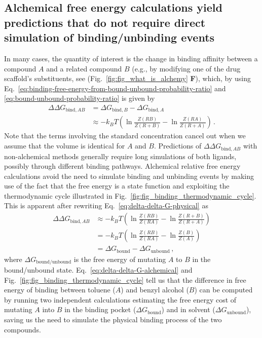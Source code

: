 \documentclass[9pt,bestpractices]{livecoms}
\begin{document}
\subsection{Alchemical free energy calculations yield predictions that do not require direct simulation of binding/unbinding events}

In many cases, the quantity of interest is the change in binding affinity between a compound $A$ and a related compound $B$ (e.g., by modifying one of the drug scaffold's substituents, see (Fig.~\ref{fig:fig_what_is_alchemy} \textbf{F}), which, by using Eq.~\ref{eq:binding-free-energy-from-bound-unbound-probability-ratio} and \ref{eq:bound-unbound-probability-ratio} is given by
\begin{equation}\label{eq:delta-delta-G-physical}
\begin{split}
    \Delta \Delta G_{\mathrm{bind}, AB} &= \Delta G_{\mathrm{bind}, B} - \Delta G_{\mathrm{bind}, A} \\
    &\approx -k_BT \left( \ln \frac{Z(RB)}{Z(R+B)} - \ln \frac{Z(RA)}{Z(R+A)} \right) \, .
\end{split}
\end{equation}
Note that the terms involving the standard concentration cancel out when we assume that the volume is identical for $A$ and $B$.
Predictions of $\Delta \Delta G_{\mathrm{bind}, AB}$ with non-alchemical methods generally require long simulations of both ligands, possibly through different binding pathways.
Alchemical relative free energy calculations avoid the need to simulate binding and unbinding events by making use of the fact that the free energy is a state function and exploiting the thermodynamic cycle illustrated in Fig.~\ref{fig:fig_binding_thermodynamic_cycle}.
This is apparent after rewriting Eq.~\ref{eq:delta-delta-G-physical} as
\begin{equation}\label{eq:delta-delta-G-alchemical}
\begin{split}
    \Delta \Delta G_{\mathrm{bind}, AB} &\approx -k_BT \left( \ln \frac{Z(RB)}{Z(RA)} - \ln \frac{Z(R+B)}{Z(R+A)} \right) \\
    &= -k_BT \left( \ln \frac{Z(RB)}{Z(RA)} - \ln \frac{Z(B)}{Z(A)} \right) \\
    &= \Delta G_{\mathrm{bound}} - \Delta G_{\mathrm{unbound}} \, ,
\end{split}
\end{equation}
where $\Delta G_{\mathrm{bound/unbound}}$ is the free energy of mutating $A$ to $B$ in the bound/unbound state.
Eq.~\ref{eq:delta-delta-G-alchemical} and Fig.~\ref{fig:fig_binding_thermodynamic_cycle} tell us that the difference in free energy of binding between toluene ($A$) and benzyl alcohol ($B$) can be computed by running two independent calculations estimating the free energy cost of mutating $A$ into $B$ in the binding pocket ($\Delta G_{\mathrm{bound}}$) and in solvent ($\Delta G_{\mathrm{unbound}}$), saving us the need to simulate the physical binding process of the two compounds.
\end{document}
